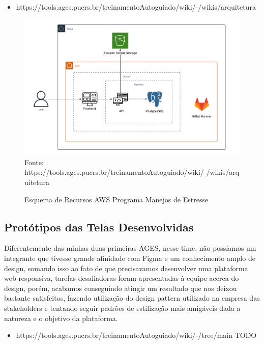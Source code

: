     \begin{itemize}
      \item https://tools.ages.pucrs.br/treinamentoAutoguiado/wiki/-/wikis/arquitetura
    \end{itemize}

    \begin{figure}[H]
        \centering
        \small
        \caption{Esquema de Recursos AWS Programa Manejos de Estresse}
        \includegraphics[width=1\linewidth]{conteudo//4 - ages III//conteudo//figures//arquitetura-aws.png}
        Fonte: https://tools.ages.pucrs.br/treinamentoAutoguiado/wiki/-/wikis/arquitetura
    \end{figure}

\subsection{Protótipos das Telas Desenvolvidas}
  Diferentemente das minhas duas primeiras AGES, nesse time, não possíamos um integrante que tivesse grande afinidade com Figma e um conhecimento amplo de design, somando isso ao fato de que precisavamos desenvolver uma plataforma web responsiva, tarefas desafiadoras foram apresentadas à equipe acerca do design, porém, acabamos conseguindo atingir um resultado que nos deixou bastante satisfeitos, fazendo utilização do design pattern utilizado na empresa das stakeholders e tentando seguir padrões de estilização mais amigáveis dada a natureza e o objetivo da plataforma.

    \begin{itemize}
      \item https://tools.ages.pucrs.br/treinamentoAutoguiado/wiki/-/tree/main TODO
    \end{itemize}

